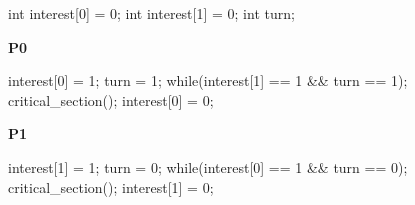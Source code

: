 \documentclass[varwidth=29em,crop]{standalone}
\begin{document}
\begin{center}
  \begin{varwidth}{.5\textwidth}
    \begin{ccode}
int interest[0] = 0;
int interest[1] = 0;
int turn;        
    \end{ccode}
  \end{varwidth}
\end{center}

\begin{minipage}{.45\linewidth}
  \textbf{P0}
  \begin{ccode}
interest[0] = 1;
turn = 1;
while(interest[1] == 1 
          && turn == 1);
critical_section();
interest[0] = 0;
  \end{ccode}
\end{minipage}\hfill
\begin{minipage}{.45\linewidth}
  \textbf{P1}
  \begin{ccode}
interest[1] = 1;
turn = 0;
while(interest[0] == 1
          && turn == 0);
critical_section();
interest[1] = 0;      
  \end{ccode}
\end{minipage}
\end{document}

